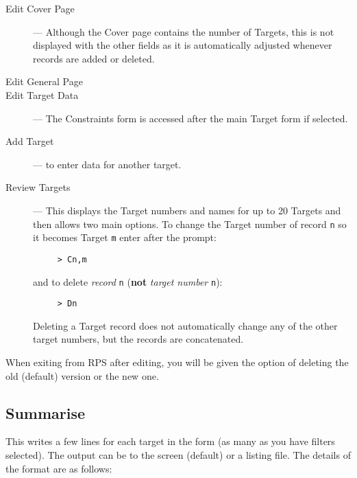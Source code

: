 \begin{description}
\begin{description}

\item [Edit Cover Page] --- Although the Cover page contains the number
of Targets, this is not displayed with the other fields as it is
automatically adjusted whenever records are added or deleted.

\item [Edit General Page] 

\item [Edit Target Data] --- The Constraints form is accessed after the
main Target form if selected.

\item [Add Target] --- to enter data for another target.

\item [Review Targets] --- This displays the Target numbers and names
for up to 20 Targets and then allows two main options. To change the
Target number of record {\tt n} so it becomes Target {\tt m} enter
after the prompt:

\begin{verbatim}
     > Cn,m
\end{verbatim}

and to delete {\em record} {\tt n} ({\bf not} {\em target number} {\tt n}):

\begin{verbatim}
     > Dn
\end{verbatim}

Deleting a Target record does not automatically change any of the other
target numbers, but the records are concatenated.

\end{description}
\end{description}

When exiting from RPS after editing, you will be given the option of
deleting the old (default) version or the new one.

\subsection{Summarise}

This writes a few lines for each target in the form (as many as you
have filters selected).  The output can be to the screen (default) or a
listing file.  The details of the format are as follows:

